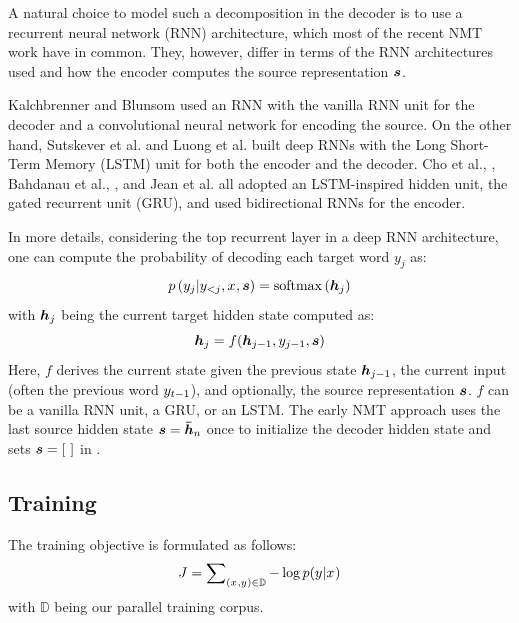 A natural choice to model such a decomposition in the decoder is to use a
recurrent neural network (RNN) architecture, which most of the recent NMT work have in common. They,
however, differ in terms of the RNN architectures used and how the encoder computes the source representation $\mbox{\boldmath{$s$}}$.

Kalchbrenner and Blunsom \cite{kal13} used an RNN with the vanilla RNN unit for the decoder and a
convolutional neural network for encoding the source. On
the other hand, Sutskever et al. \cite{sutskever14} and Luong et al.
\cite{luong15,luong15attn} built deep RNNs with the Long Short-Term Memory (LSTM) unit
\cite{lstm97} for both the encoder and the decoder. Cho et al., \cite{cho14}, Bahdanau et al.,
\cite{bog15}, and Jean et al. \cite{jean15,mono15} all adopted an
LSTM-inspired hidden unit, the gated recurrent unit (GRU), and used bidirectional
RNNs for the encoder.

In more details, considering the top recurrent layer in a deep RNN architecture, one can compute the probability of decoding each target word $y_j$ as:
\begin{equation}
p\left(y_{j}|y_{<j},x_{},\mbox{\boldmath{$s$}}\right) = \operatorname{softmax}\left(\mbox{\boldmath{$h$}}_{j}\right)
\end{equation}
with $\mbox{\boldmath{$h$}}_{j}$ being the current target hidden state computed as:
\begin{equation}
\label{e:rnn}
\mbox{\boldmath{$h$}}_{j} = f(\mbox{\boldmath{$h$}}_{j-1}, y_{j-1}, \mbox{\boldmath{$s$}})
\end{equation}
Here, $f$ derives the current state given the previous state
$\mbox{\boldmath{$h$}}_{j-1}$, the
current input (often the previous word $y_{t-1}$), and optionally, the source
representation $\mbox{\boldmath{$s$}}$.
$f$ can be a vanilla RNN unit, a GRU, or an LSTM. 
The early NMT approach  \cite{kal13,sutskever14,cho14,luong15} uses the last source hidden state
$\mbox{\boldmath{$s$}}=\mbox{\boldmath{$\bar{h}$}}_{n}$ once to initialize the decoder hidden state and sets $\mbox{\boldmath{$s$}}=[\text{ }]$ in
.

\subsection{Training}
The training objective is formulated as follows:
\begin{equation}
J = \sum_{(x_{},y_{}) \in \mathbb{D}} \nolimits -\log p(y_{}|x_{})
\label{e:j_t}
\end{equation}
with $\mathbb{D}$ being our parallel training corpus.

